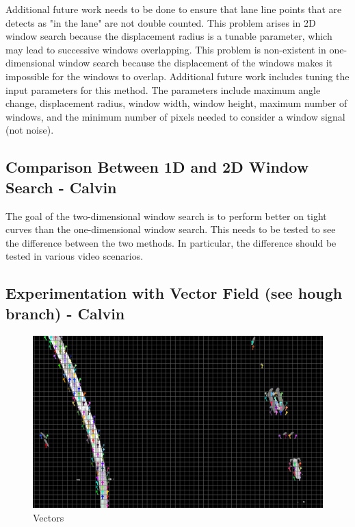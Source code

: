 \documentclass[twoside,twocolumn]{article}
\begin{document}
\par Additional future work needs to be done to ensure that lane line points that are detects as "in the lane" are not double counted. This problem arises in 2D window search because the displacement radius is a tunable parameter, which may lead to successive windows overlapping. This problem is non-existent in one-dimensional window search because the displacement of the windows makes it impossible for the windows to overlap. Additional future work includes tuning the input parameters for this method. The parameters include maximum angle change, displacement radius, window width, window height, maximum number of windows, and the minimum number of pixels needed to consider a window signal (not noise).

\subsection{Comparison Between 1D and 2D Window Search - Calvin}
\par The goal of the two-dimensional window search is to perform better on tight curves than the one-dimensional window search. This needs to be tested to see the difference between the two methods. In particular, the difference should be tested in various video scenarios.


\subsection{Experimentation with Vector Field (see hough branch) - Calvin}
\begin{figure}
  \includegraphics[width=\linewidth]{calvin5.png}
  \caption{Vectors}
  \label{fig:vectors}
\end{figure}
\end{document}
